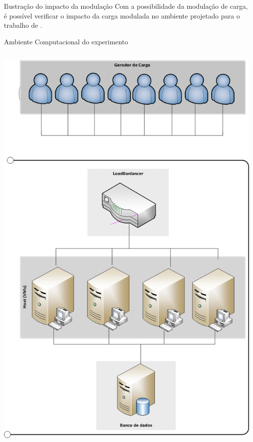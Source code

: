 \begin{frame}{Ilustração do impacto da modulação}
	Com a possibilidade da modulação de carga, é possível verificar o impacto da carga modulada no ambiente projetado para o trabalho de \cite{Edwin2015}.
\end{frame}
	
\begin{frame}{Ambiente Computacional do experimento}
	\begin{columns}
		\begin{minipage}[c][0.4\textheight][c]{\linewidth}
			\centering
			\includegraphics[scale=0.17]{../monograph/images/arquitetura-experimento.png}		
		\end{minipage}

\end{columns}
\end{frame}
